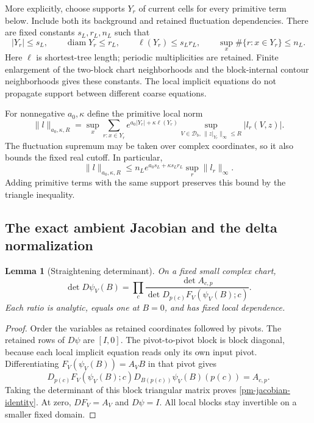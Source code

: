 \documentclass[11pt]{article}
\newtheorem{lemma}[theorem]{Lemma}
\theoremstyle{remark}
\begin{document}
More explicitly, choose supports $Y_r$ of current cells for
every primitive term below. Include both its background and
retained fluctuation dependencies. There are fixed constants
$s_L,r_L,n_L$ such that
\begin{equation}\label{pm-support-bounds}
 |Y_r|\le s_L,\qquad \operatorname{diam}Y_r\le r_L,
 \qquad \ell(Y_r)\le s_Lr_L,\qquad
 \sup_x\#\{r:x\in Y_r\}\le n_L.
\end{equation}
Here $\ell$ is shortest-tree length; periodic multiplicities
are retained. Finite enlargement of the two-block chart
neighborhoods and the block-internal contour neighborhoods
gives these constants. The local implicit equations do not
propagate support between different coarse equations.

For nonnegative $a_0,\kappa$ define the primitive local norm
\begin{equation}\label{pm-local-norm}
 \|l\|_{a_0,\kappa,R}
 =\sup_x\sum_{r:x\in Y_r}
 e^{a_0|Y_r|+\kappa\ell(Y_r)}
 \sup_{V\in\mathcal D_b,\,\|z|_{Y_r}\|_\infty\le R}|l_r(V,z)|.
\end{equation}
The fluctuation supremum may be taken over complex coordinates,
so it also bounds the fixed real cutoff. In particular,
\begin{equation}\label{pm-incidence-bound}
 \|l\|_{a_0,\kappa,R}
 \le n_Le^{a_0s_L+\kappa s_Lr_L}\sup_r\|l_r\|_\infty.
\end{equation}
Adding primitive terms with the same support preserves this
bound by the triangle inequality.

\subsection{The exact ambient Jacobian and the delta normalization}
\label{pm-jacobian-section}

\begin{lemma}[Straightening determinant]\label{pm-jacobian-lemma}
On a fixed small complex chart,
\begin{equation}\label{pm-jacobian-identity}
 \det D\psi_V(B)=\prod_c
 \frac{\det A_{c,p}}
      {\det D_{p(c)}F_V(\psi_V(B);c)}.
\end{equation}
Each ratio is analytic, equals one at $B=0$, and has fixed
local dependence.
\end{lemma}
\begin{proof}
Order the variables as retained coordinates followed by
pivots. The retained rows of $D\psi$ are $[I,0]$.
The pivot-to-pivot block is block diagonal, because each local
implicit equation reads only its own input pivot. Differentiating
$F_V(\psi_V(B))=A_VB$ in that pivot gives
\[
 D_{p(c)}F_V(\psi_V(B);c)
 D_{B(p(c))}\psi_V(B)(p(c))=A_{c,p}.
\]
Taking the determinant of this block triangular matrix proves
\eqref{pm-jacobian-identity}. At zero, $DF_V=A_V$ and
$D\psi=I$. All local blocks stay invertible on a smaller
fixed domain.
\end{proof}
\end{document}
